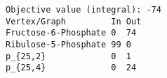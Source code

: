 \begin{verbatim}
Objective value (integral): -74
Vertex/Graph         In Out 
Fructose-6-Phosphate 0  74  
Ribulose-5-Phosphate 99 0   
p_{25,2}             0  1   
p_{25,4}             0  24  
\end{verbatim}
